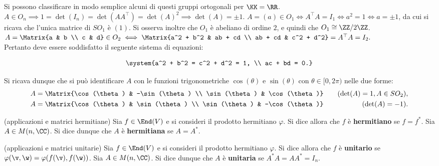 \documentclass[11pt]{article}
\begin{document}
	\begin{remark}
		Si possono classificare in modo semplice alcuni di questi gruppi ortogonali per $\KK = \RR$. \\
		
		\li $A \in O_n \implies 1 = \det(I_n) = \det(A A^\top) = \det(A)^2 \implies \det(A) = \pm 1$.
		\li $A = (a) \in O_1 \iff A^\top A = I_1 \iff a^2 = 1 \iff a = \pm 1$, da cui si ricava che l'unica matrice
		di $SO_1$ è $(1)$. Si osserva inoltre che $O_1$ è abeliano di ordine $2$, e quindi che $O_1 \cong \ZZ/2\ZZ$. \\
		\li $A = \Matrix{a & b \\ c & d} \in O_2 \iff \Matrix{a^2 + b^2 & ab + cd \\ ab + cd & c^2 + d^2} = A^\top A = I_2.$ \\
		
		Pertanto deve essere soddisfatto il seguente sistema di equazioni:
		
		\[ \system{a^2 + b^2 = c^2 + d^2 = 1, \\ ac + bd = 0.} \]
		
		Si ricava dunque che si può identificare
		$A$ con le funzioni trigonometriche $\cos(\theta)$ e $\sin(\theta)$ con $\theta \in [0, 2\pi)$ nelle due forme:
		\begin{align*}
			&A = \Matrix{\cos(\theta) & -\sin(\theta) \\ \sin(\theta) & \cos(\theta)} \quad &\text{(}\!\det(A) = 1, A \in SO_2\text{)}, \\
			&A = \Matrix{\cos(\theta) & \sin(\theta) \\ \sin(\theta) & -\cos(\theta)} \quad &\text{(}\!\det(A) = -1\text{)}.
		\end{align*}
	\end{remark}

	\begin{definition} (applicazioni e matrici hermitiane)
		Sia $f \in \End(V)$ e si consideri il prodotto hermitiano $\varphi$. Si dice allora che
		$f$ è \textbf{hermitiano} se $f = f^*$. Sia $A \in M(n, \CC)$. Si dice dunque che $A$
		è \textbf{hermitiana} se $A = A^*$.
	\end{definition}

	\begin{definition} (applicazioni e matrici unitarie)
		Sia $f \in \End(V)$ e si consideri il prodotto hermitiano $\varphi$. Si dice allora che
		$f$ è \textbf{unitario} se $\varphi(\v, \w) = \varphi(f(\v), f(\w))$. Sia $A \in M(n, \CC)$.
		Si dice dunque che $A$ è \textbf{unitaria} se $A^* A = A A^* = I_n$.
	\end{definition}
\end{document}
